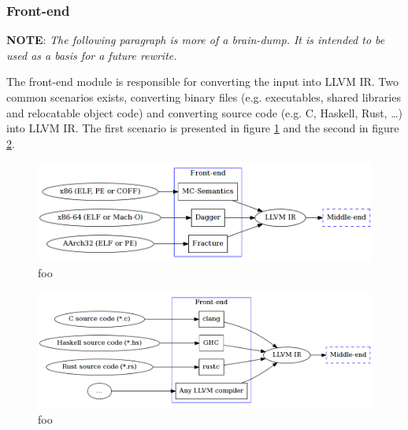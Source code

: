 \subsubsection{Front-end}


\textbf{NOTE}: \textit{The following paragraph is more of a brain-dump. It is intended to be used as a basis for a future rewrite.}

The front-end module is responsible for converting the input into LLVM IR. Two common scenarios exists, converting binary files (e.g. executables, shared libraries and relocatable object code) and converting source code (e.g. C, Haskell, Rust, …) into LLVM IR. The first scenario is presented in figure \ref{fig:front-end_binary} and the second in figure \ref{fig:front-end_source}.


\begin{figure}[htbp]
	\begin{center}
		\includegraphics[width=\textwidth]{inc/front-end_binary.png}
		\caption{foo}
		\label{fig:front-end_binary}
	\end{center}
\end{figure}

\begin{figure}[htbp]
	\begin{center}
		\includegraphics[width=\textwidth]{inc/front-end_source.png}
		\caption{foo}
		\label{fig:front-end_source}
	\end{center}
\end{figure}


